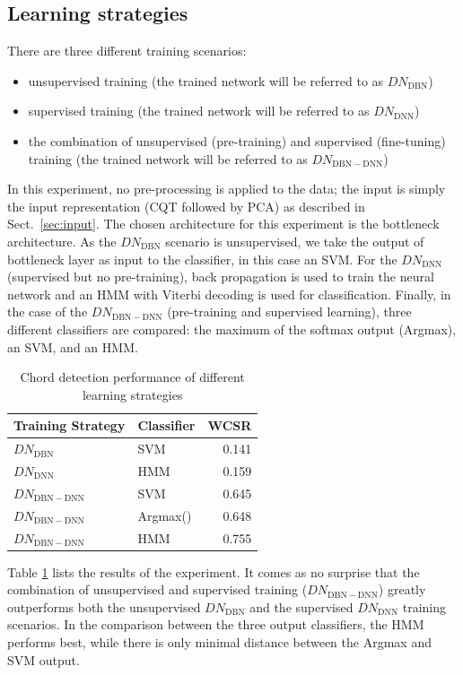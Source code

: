 \documentclass{article}
\begin{document}
\subsection{Learning strategies}
There are three different training scenarios:
\begin{itemize}
	\item   unsupervised training (the trained network will be referred to as $DN_\mathrm{DBN}$)
	\item   supervised training (the trained network will be referred to as $DN_\mathrm{DNN}$)
    \item   the combination of unsupervised (pre-training) and supervised (fine-tuning) training  (the trained network will be referred to as $DN_\mathrm{DBN-DNN}$)
\end{itemize} 
In this experiment, no pre-processing is applied to the data; the input is simply the input representation (CQT followed by PCA) as described in Sect.~\ref{sec:input}. The chosen architecture for this experiment is the bottleneck architecture.
As the $DN_\mathrm{DBN}$ scenario is unsupervised, we take the output of bottleneck layer as input to the classifier, in this case an SVM. For the $DN_\mathrm{DNN}$ (supervised but no pre-training), back propagation is used to train the neural network and an HMM with Viterbi decoding is used for classification. Finally, in the case of the $DN_\mathrm{DBN-DNN}$ (pre-training and supervised learning), three different classifiers are compared: the maximum of the softmax output (Argmax), an SVM, and an HMM. 
\begin{table}
\centering
\begin{tabular}{@{}llr@{}}
\toprule
Training Strategy & Classifier & WCSR  \\ \hline
$DN_\mathrm{DBN}$             & SVM            & 0.141 \\ 
$DN_\mathrm{DNN}$              & HMM            & 0.159      \\ 
$DN_\mathrm{DBN-DNN}$          & SVM            & 0.645 \\ 
$DN_\mathrm{DBN-DNN}$         & Argmax()            & 0.648 \\ 
$DN_\mathrm{DBN-DNN}$         &  HMM           & 0.755 \\ \hline
\end{tabular}
\caption{Chord detection performance of different learning strategies}
\label{dbn-dnn}
\end{table}

Table \ref{dbn-dnn} lists the results of the experiment. It comes as no surprise that the combination of unsupervised and supervised training ($DN_\mathrm{DBN-DNN}$) greatly outperforms both the unsupervised $DN_\mathrm{DBN}$ and the supervised $DN_\mathrm{DNN}$ training scenarios. In the comparison between the three output classifiers, the HMM performs best, while there is only minimal distance between the Argmax and SVM output.
\end{document}
